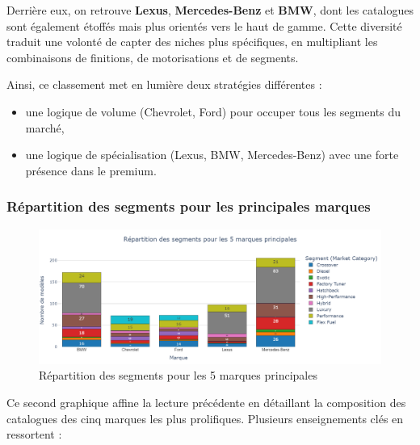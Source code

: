 \documentclass[12pt]{report}
\begin{document}
Derrière eux, on retrouve \textbf{Lexus}, \textbf{Mercedes-Benz} et \textbf{BMW}, dont les catalogues sont également étoffés mais plus orientés vers le haut de gamme. Cette diversité traduit une volonté de capter des niches plus spécifiques, en multipliant les combinaisons de finitions, de motorisations et de segments.

Ainsi, ce classement met en lumière deux stratégies différentes : 
\begin{itemize}
    \item une logique de volume (Chevrolet, Ford) pour occuper tous les segments du marché,
    \item une logique de spécialisation (Lexus, BMW, Mercedes-Benz) avec une forte présence dans le premium.
\end{itemize}

\subsubsection{Répartition des segments pour les principales marques}

\begin{figure}[H]
    \centering
    \includegraphics[width=1\textwidth]{Marque_nbmodele.png}
    \caption{Répartition des segments pour les 5 marques principales}
    \label{fig:marque-nbmodele}
\end{figure}

Ce second graphique affine la lecture précédente en détaillant la composition des catalogues des cinq marques les plus prolifiques. Plusieurs enseignements clés en ressortent :
\end{document}

